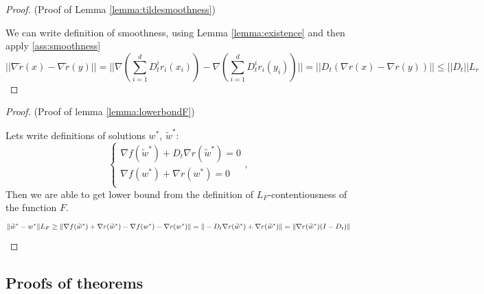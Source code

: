 \documentclass[USenglish]{article}
\theoremstyle{dgthm}
\theoremstyle{dgdef}
\begin{document}
\begin{proof} (Proof of Lemma \ref{lemma:tildesmoothness})

We can write definition of smoothness, using Lemma \ref{lemma:existence} and then apply \ref{ass:smoothness}
\begin{equation*}
    || \nabla \widetilde{r}(x) - \nabla \widetilde{r}(y) || =
    || \nabla \left( \sum_{i=1}^d D_t^i r_i(x_i) \right) - \nabla \left( \sum_{i=1}^d D_t^i r_i(y_i) \right) || =
    ||D_t \left( \nabla r(x) - \nabla r(y) \right)|| \le  ||D_t|| L_r
\end{equation*}
\end{proof}

\begin{proof} (Proof of lemma \ref{lemma:lowerbondF})

    Lets write definitions of solutions $w^*$, $\widetilde{w}^*$:
        \begin{equation*}
        \begin{cases}
            \nabla f (\widetilde{w}^*) + D_t \nabla r(\widetilde{w}^*) = 0\\
            \nabla f (w^*) + \nabla r(w^*) = 0\\
        \end{cases},
        \end{equation*}
        Then we are able to get lower bound from the definition of $L_F$-contentiousness of the function $F$.
        \begin{equation*}
        \|\widetilde{w}^* - w^* \| L_F \geq \| \nabla f (\widetilde{w}^*) + \nabla r(\widetilde{w}^*) - \nabla f (w^*) - \nabla r (w^*) \| \\
        = \| - D_t \nabla r (\widetilde{w}^*) + \nabla r(\widetilde{w}^*) \|  = \| \nabla r (\widetilde{w}^*) (I - D_t)\|
        \end{equation*}
\end{proof}



\subsection{Proofs of theorems}
\end{document}
